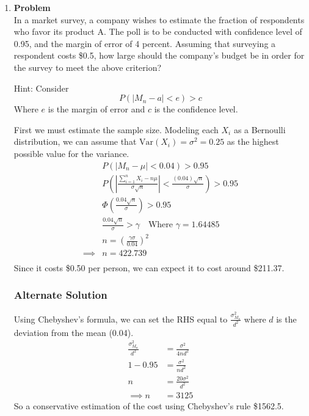 \documentclass[12pt]{article}
\newenvironment{Ex}{\textbf{Problem}\vspace{.75em}\\}{}
\begin{document}
\begin{enumerate}
\item
  \begin{Ex}
    In a market survey, a company wishes to estimate the fraction of
    respondents who favor its product A. The poll is to be conducted
    with confidence level of 0.95, and the margin of error of 4
    percent. Assuming that surveying a respondent costs \$0.5, how
    large should the company's budget be in order for the survey to
    meet the above criterion?

    Hint: Consider
    \begin{equation}
      \label{eq:5-hint}
      P(|M_n-a|<e)>c
    \end{equation}
    Where $e$ is the margin of error and $c$ is the confidence level.
    \begin{solution} \hfill
      First we must estimate the sample size. Modeling each $X_i$ as a
      Bernoulli distribution, we can assume that $\text{Var}(X_i) =
      \sigma^2 = 0.25$ as the highest possible value for the variance.
      \begin{equation}
        \label{eq:5-sol}
        \begin{aligned}
          &P(|M_n - \mu| < 0.04) > 0.95 \\
          &P\left(\left|\frac{\sum_{i=1}^n X_i - n\mu}{\sigma\sqrt{n}}\right| < \frac{(0.04)\sqrt{n}}{\sigma}\right) > 0.95 \\
          &\Phi\left(\frac{0.04\sqrt{n}}{\sigma}\right) > 0.95 \\
          &\frac{0.04\sqrt{n}}{\sigma} > \gamma \quad\text{Where } \gamma = 1.64485 \\
          &n = \left(\frac{\gamma\sigma}{0.04}\right)^2 \\
          \implies &n = 422.739 \\
        \end{aligned}
      \end{equation}
      Since it costs \$0.50 per person, we can expect it to cost
      around \$211.37.

      \subsubsection*{Alternate Solution}
      Using Chebyshev's formula, we can set the RHS
      equal to $\frac{\sigma_{M_n}^2}{d^2}$ where $d$ is the deviation from
      the mean (0.04).
      \begin{equation}
        \label{eq:5-alt-sol}
        \begin{aligned}
          \frac{\sigma_{M_n}^2}{d^2} &= \frac{\sigma^2}{4 n d^2} \\
          1-0.95 &= \frac{\sigma^2}{n d^2} \\
          n &= \frac{20\sigma^2}{d^2} \\
          \implies n &= 3125
        \end{aligned}
      \end{equation}
      So a conservative estimation of the cost using Chebyshev's rule
      \$1562.5.
    \end{solution}
  \end{Ex}


\end{enumerate}
\end{document}
